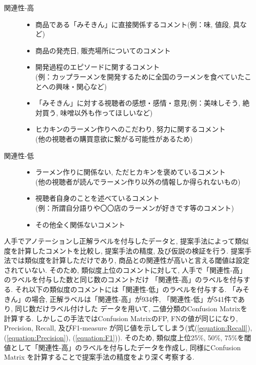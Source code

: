 \documentclass{ltjarticle}
\begin{document}
\begin{description}
    \item[関連性-高]\mbox{}
    \begin{itemize}
        \item 商品である「みそきん」に直接関係するコメント(例：味, 値段, 具など)
        \item 商品の発売日, 販売場所についてのコメント
        \item 開発過程のエピソードに関するコメント\\(例：カップラーメンを開発するために全国のラーメンを食べていたことへの興味・関心など)
        \item 「みそきん」に対する視聴者の感想・感情・意見(例：美味しそう, 絶対買う, 味噌以外も作ってほしいなど)
        \item ヒカキンのラーメン作りへのこだわり, 努力に関するコメント\\(他の視聴者の購買意欲に繋がる可能性があるため) 
    \end{itemize}
    \item[関連性-低] \mbox{}
    \begin{itemize}
        \item ラーメン作りに関係ない, ただヒカキンを褒めているコメント\\(他の視聴者が読んでラーメン作り以外の情報しか得られないもの)
        \item 視聴者自身のことを述べているコメント\\(例：所謂自分語りや〇〇店のラーメンが好きです等のコメント)
        \item その他全く関係ないコメント
    \end{itemize}
\end{description}
\vspace{10truept}

人手でアノテーションし正解ラベルを付与したデータと, 提案手法によって類似度を計算したコメントを比較し, 
提案手法の精度, 及び仮説の検証を行う. 
提案手法では類似度を計算しただけであり, 商品との関連性が高いと言える閾値は設定されていない. 
そのため, 類似度上位のコメントに対して, 人手で「関連性-高」のラベルを付与した数と同じ数のコメントだけ
「関連性-高」のラベルを付与する. 
それ以下の類似度のコメントには「関連性-低」のラベルを付与する. 
「みそきん」の場合, 正解ラベルは「関連性-高」が934件, 「関連性-低」が541件であり, 同じ数だけラベル付けした
データを用いて, 二値分類のConfusion Matrixを計算する. 
しかしこの手法ではConfusion MatrixのFP, FNの値が同じになり, Precision, Recall, 及びF1-measure
が同じ値を示してしまう(式(\ref{equation:Recall}), (\ref{equation:Precision}), (\ref{equation:F1})). 
そのため, 類似度上位25\%, 50\%, 75\%を閾値として「関連性-高」のラベルを付与したデータを作成し, 同様にConfusion Matrix
を計算することで提案手法の精度をより深く考察する. 
\end{document}
